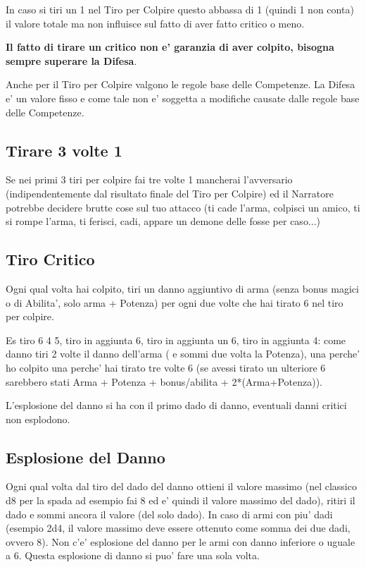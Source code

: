 \documentclass[a4paper,11pt,twoside,openany]{dndbook}
\begin{document}
In caso si tiri un 1 nel Tiro per Colpire questo abbassa di 1 (quindi 1 non conta) il valore totale ma non influisce sul fatto di aver fatto critico o meno.

\textbf{Il fatto di tirare un critico non e' garanzia di aver colpito,
bisogna sempre superare la Difesa}.

Anche per il Tiro per Colpire valgono le regole base delle Competenze.
La Difesa e' un valore fisso e come tale non e' soggetta a modifiche
causate dalle regole base delle Competenze.

\subsection{Tirare 3 volte 1}

Se nei primi 3 tiri per colpire fai tre volte 1 mancherai l'avversario (indipendentemente dal risultato finale del Tiro per Colpire) ed il Narratore potrebbe decidere brutte cose sul tuo attacco (ti cade l'arma, colpisci un amico, ti si rompe l'arma, ti ferisci, cadi, appare un demone delle fosse per caso...)

\subsection{Tiro Critico}

Ogni qual volta hai colpito, tiri un danno aggiuntivo di arma (senza bonus magici o di Abilita', solo arma + Potenza) per ogni due volte che hai tirato 6 nel tiro per colpire.

Es tiro 6 4 5, tiro in aggiunta 6, tiro in aggiunta un 6, tiro in aggiunta 4: come danno tiri 2 volte il danno dell'arma ( e sommi due volta la Potenza), una perche' ho colpito una perche' hai tirato tre volte 6 (se avessi tirato un ulteriore 6 sarebbero stati Arma + Potenza + bonus/abilita + 2{*}(Arma+Potenza)).

L'esplosione del danno si ha con il primo dado di danno, eventuali danni critici non esplodono.

\subsection{Esplosione del Danno}

Ogni qual volta dal tiro del dado del danno ottieni il valore massimo (nel classico d8 per la spada ad esempio fai 8 ed e' quindi il valore massimo del dado), ritiri il dado e sommi ancora il valore (del solo dado). In caso di armi con piu' dadi (esempio 2d4, il valore massimo deve essere ottenuto come somma dei due dadi, ovvero 8). Non c'e' esplosione del danno per le armi con danno inferiore o uguale a 6. Questa esplosione di danno si puo' fare una sola volta.
\end{document}

